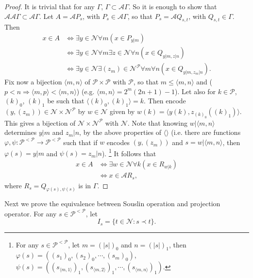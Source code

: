 \begin{proof}
It is trivial that for any $\Gamma$, $\Gamma\subset\mathcal{A}\Gamma$. So it is
enough to show that 
$\mathcal{A}\mathcal{A}\Gamma\subset \mathcal{A}\Gamma$.
Let $A=\mathcal{A}P_s$, with $P_s\in\mathcal{A}\Gamma$, so that 
$P_s=\mathcal{A}Q_{s,t}$, with $Q_{s,t}\in\Gamma$. Then
\begin{align*}
  x\in A 
    & \iff \exists y\in\mathcal{N} \forall m (x\in P_{y|m}) \\
    & \iff \exists y\in\mathcal{N} \forall m 
        \exists z\in\mathcal{N} \forall n (x\in Q_{y|m, z|n}) \\
    & \iff \exists y\in\mathcal{N} \exists(z_m)\in\mathcal{N}^{\mathcal{P}}
        \forall m \forall n (x\in Q_{y|m, z_m|n}).
\end{align*}
Fix now a bijection $\langle m,n\rangle$ of $\mathcal{P}\times \mathcal{P}$ 
with $\mathcal{P}$, so that $m\le\langle m,n \rangle$ and 
($p<n \Rightarrow \langle m,p \rangle < \langle m,n \rangle$)
(e.g. $\langle m,n \rangle = 2^m (2n+1) - 1$). Let also for $k\in \mathcal{P}$,
$(k)_0$, $(k)_1$ be such that $\langle (k)_0,(k)_1 \rangle=k$. Then encode
$(y,(z_m))\in \mathcal{N}\times\mathcal{N}^{\mathcal{P}}$ by $w\in\mathcal{N}$
given by $w(k)=\langle y(k), z_{(k)_0}((k)_1)\rangle$. This gives a bijection of 
$\mathcal{N}\times\mathcal{N}^{\mathcal{P}}$ with $\mathcal{N}$. Note that
knowing $w|\langle m,n \rangle$ determines $y|m$ and $z_m|n$, by the above
properties of $\langle\rangle$ (i.e. there are functions 
$\varphi,\psi: \mathcal{P}^{<\mathcal{P}} \to \mathcal{P}^{<\mathcal{P}}$ 
such that if $w$ encodes $(y,(z_m))$ and $s=w|\langle m,n\rangle$, then
$\varphi(s)=y|m$ and $\psi(s)=z_m|n$). 
\footnote{
For any $s\in \mathcal{P}^{<\mathcal{P}}$, let $m=(|s|)_0$ and $n=(|s|)_1$,
then $\varphi(s)=((s_1)_0, (s_2)_0, \cdots, (s_m)_0)$,
$\psi(s)=((s_{\langle m,1\rangle})_1, (s_{\langle m,2\rangle})_1,\cdots,(s_{\langle m,n\rangle})_1)$. 
}
It follows that
\begin{align*}
  x\in A 
    & \iff \exists w\in\mathcal{N} \forall k (x\in R_{w|k}) \\
    & \iff x\in \mathcal{A} R_s,
\end{align*}
where $R_s=Q_{\varphi(s),\psi(s)}$ is in $\Gamma$.
\end{proof}

Next we prove the equivalence between Souslin operation and projection operator.
For any $s\in\mathcal{P}^{<\mathcal{P}}$, let
\[
  I_s = \{ t\in\mathcal{N}: s\prec t \}.
\]

